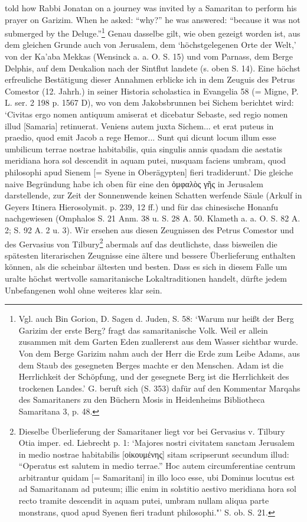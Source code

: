 \documentclass[a4paper, 11pt, oneside]{article}
\begin{document}
told how Rabbi Jonatan on a journey was invited by a Samaritan to perform his prayer on Garizim. When he asked: "`why?"' he was answered: "`because it was not submerged by the Deluge."'\footnote{Vgl. auch Bin Gorion, D. Sagen d. Juden, S. 58: `Warum nur heißt der Berg Garizim der erste Berg? fragt das samaritanische Volk. Weil er allein zusammen mit dem Garten Eden zuallererst aus dem Wasser sichtbar wurde. Von dem Berge Garizim nahm auch der Herr die Erde zum Leibe Adams, aus dem Staub des gesegneten Berges machte er den Menschen. Adam ist die Herrlichkeit der Schöpfung, und der gesegnete Berg ist die Herrlichkeit des trockenen Landes.' G. beruft sich (S. 353) dafür auf den Kommentar Marqahs des Samaritaners zu den Büchern Mosis in Heidenheims Bibliotheca Samaritana 3, p. 48.} Genau dasselbe gilt, wie oben gezeigt worden ist, aus dem gleichen Grunde auch von Jerusalem, dem `höchstgelegenen Orte der Welt,' von der Ka'aba Mekkas (Wensinck a. a. O. S. 15) und vom Parnass, dem Berge Delphis, auf dem Deukalion nach der Sintflut landete (s. oben S. 14). Eine höchst erfreuliche Bestätigung dieser Annahmen erblicke ich in dem Zeuguis des Petrus Comestor (12. Jahrh.) in seiner Historia scholastica in Evangelia 58 (= Migne, P. L. ser. 2 198 p. 1567 D), wo von dem Jakobsbrunnen bei Sichem berichtet wird: `Civitas ergo nomen antiquum amiserat et dicebatur Sebaste, sed regio nomen illud [Samaria] retinuerat. Veniens autem juxta Sichem... et erat puteus in praedio, quod emit Jacob a rege Hemor... Sunt qui dicunt locum illum esse umbilicum terrae nostrae habitabilis, quia singulis annis quadam die aestatis meridiana hora sol descendit in aquam putei, nusquam faciens umbram, quod philosophi apud Sienem [= Syene in Oberägypten] fieri tradiderunt.' Die gleiche naive Begründung habe ich oben für eine den ὀμφαλὸς γῆς in Jerusalem darstellende, zur Zeit der Sonnenwende keinen Schatten werfende Säule (Arkulf in Geyers Itinera Hierosolymit. p. 239, 12 ff.) und für das chinesische Honanfu nachgewiesen (Omphalos S. 21 Anm. 38 u. S. 28 A. 50. Klameth a. a. O. S. 82 A. 2; S. 92 A. 2 u. 3). Wir ersehen aus diesen Zeugnissen des Petrus Comestor und des Gervasius von Tilbury\footnote{Dieselbe Überlieferung der Samaritaner liegt vor bei Gervasius v. Tilbury Otia imper. ed. Liebrecht p. 1: `Majores nostri civitatem sanctam Jerusalem in medio nostrae habitabilis [οἰκουμένης] sitam scripserunt secundum illud: "`Operatus est salutem in medio terrae."' Hoc autem circumferentiae centrum arbitrantur quidam [= Samaritani] in illo loco esse, ubi Dominus locutus est ad Samaritanam ad puteum; illic enim in solstitio aestivo meridiana hora sol recto tramite descendit in aquam putei, umbram nullam aliqua parte monstrans, quod apud Syenen fieri tradunt philosophi."' S. ob. S. 21.} abermals auf das deutlichste, dass bisweilen die spätesten literarischen Zeugnisse eine ältere und bessere Überlieferung enthalten können, als die scheinbar ältesten und besten. Dass es sich in diesem Falle um uralte höchst wertvolle samaritanische Lokaltraditionen handelt, dürfte jedem Unbefangenen wohl ohne weiteres klar sein.
\end{document}
